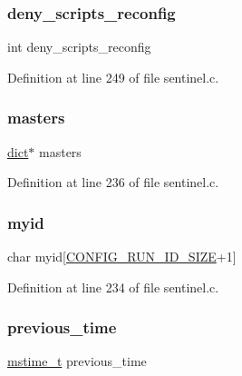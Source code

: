 \subsubsection{\texorpdfstring{deny\+\_\+scripts\+\_\+reconfig}{deny\_scripts\_reconfig}}
{\footnotesize\ttfamily int deny\+\_\+scripts\+\_\+reconfig}



Definition at line 249 of file sentinel.\+c.

\mbox{\label{structsentinel_state_a08cec43573ee36e058c8e7435eac34da}} 
\subsubsection{\texorpdfstring{masters}{masters}}
{\footnotesize\ttfamily \hyperlink{structdict}{dict}$\ast$ masters}



Definition at line 236 of file sentinel.\+c.

\mbox{\label{structsentinel_state_ae6eea215201bb739eae78c29903a3d12}} 
\subsubsection{\texorpdfstring{myid}{myid}}
{\footnotesize\ttfamily char myid\mbox{[}\hyperlink{server_8h_aba6794fa3ee28f85165eaed93190f1df}{C\+O\+N\+F\+I\+G\+\_\+\+R\+U\+N\+\_\+\+I\+D\+\_\+\+S\+I\+ZE}+1\mbox{]}}



Definition at line 234 of file sentinel.\+c.

\mbox{\label{structsentinel_state_a3c93681031930ca24d9d49e9f0b915a0}} 
\subsubsection{\texorpdfstring{previous\+\_\+time}{previous\_time}}
{\footnotesize\ttfamily \hyperlink{redismodule_8h_a652ae61e2475bc8957454534544968fc}{mstime\+\_\+t} previous\+\_\+time}



